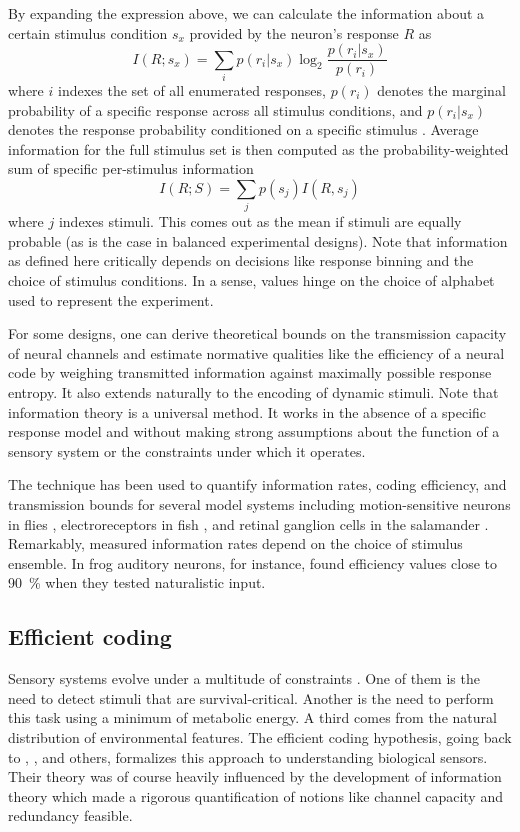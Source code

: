By expanding the expression above, we can calculate the information about a certain stimulus condition $s_x$ provided by the neuron's response $R$ as
\begin{equation}
    I(R; s_x) = \sum_{i} p(r_i | s_x) \log_2 \frac{p(r_i | s_x)}{p(r_i)}
\end{equation}
where $i$ indexes the set of all enumerated responses, $p(r_i)$ denotes the marginal probability of a specific response across all stimulus conditions, and $p(r_i | s_x)$ denotes the response probability conditioned on a specific stimulus \citep{Borst:1999hw}. Average information for the full stimulus set is then computed as the probability-weighted sum of specific per-stimulus information
\begin{equation}
    I(R; S) = \sum_{j} p(s_j) I(R, s_j)
\end{equation}
where $j$ indexes stimuli. This comes out as the mean if stimuli are equally probable (as is the case in balanced experimental designs). Note that information as defined here critically depends on decisions like response binning and the choice of stimulus conditions. In a sense, values hinge on the choice of alphabet used to represent the experiment.

For some designs, one can derive theoretical bounds on the transmission capacity of neural channels and estimate normative qualities like the efficiency of a neural code by weighing transmitted information against maximally possible response entropy. It also extends naturally to the encoding of dynamic stimuli. Note that information theory is a universal method. It works in the absence of a specific response model and without making strong assumptions about the function of a sensory system or the constraints under which it operates.

The technique has been used to quantify information rates, coding efficiency, and transmission bounds for several model systems including motion-sensitive neurons in flies \citep{Bialek:1991aa,vanSteveninck:1997aa,Haag:1998wr,Weber:2012dr}, electroreceptors in fish \citep{Wessel:1996aa}, and retinal ganglion cells in the salamander \citep{Warland:1997aa}. Remarkably, measured information rates depend on the choice of stimulus ensemble. In frog auditory neurons, for instance, \citet{Rieke:1995aa} found efficiency values close to \SI{90}{\percent} when they tested naturalistic input.

\subsection{Efficient coding}
Sensory systems evolve under a multitude of constraints \citep{Sterling:2015aa}. One of them is the need to detect stimuli that are survival-critical. Another is the need to perform this task using a minimum of metabolic energy. A third comes from the natural distribution of environmental features. The efficient coding hypothesis, going back to \citet{Attneave:1954aa}, \citet{Barlow:1961aa}, and others, formalizes this approach to understanding biological sensors. Their theory was of course heavily influenced by the development of information theory which made a rigorous quantification of notions like channel capacity and redundancy feasible.

